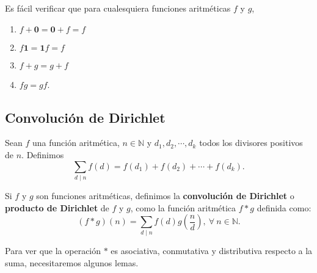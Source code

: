 Es fácil verificar que para cualesquiera funciones aritméticas $f$ y $g$,
\begin{enumerate}[label=\textnormal{(\roman*)}]
\item $f+\mathbf{0}=\mathbf{0}+f=f$ 
\item $f\mathbf{1}=\mathbf{1}f=f$ 
\item $f+g=g+f$
\item $fg=gf$.
\end{enumerate}

\subsection{Convolución de Dirichlet}

\begin{definition}
Sean $f$ una función aritmética, $n\in\mathbb{N}$ y $d_1,d_2,\cdots,d_k$ todos los divisores positivos de $n$. Definimos 
\begin{equation*}
	\sum_{d \mid n} f(d)=f(d_1)+f(d_2)+\cdots+f(d_k).
\end{equation*}
\end{definition}

\begin{definition}
Si $f$ y $g$ son funciones aritméticas, definimos la \textbf{convolución de Dirichlet} o \textbf{producto de Dirichlet} de $f$ y $g$, como la función aritmética $f*g$ definida como:
\begin{equation*}
	(f*g)(n)=\sum_{d \mid n} f(d)g\left(\frac{n}{d}\right),\:\forall \: n\in\mathbb{N}.
\end{equation*}
\end{definition}

Para ver que la operación $*$ es asociativa, conmutativa y distributiva respecto a la suma, necesitaremos algunos lemas.

